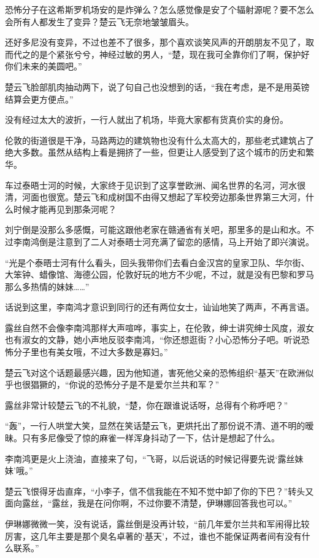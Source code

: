 恐怖分子在这希斯罗机场安的是炸弹么？怎么感觉像是安了个辐射源呢？要不怎么会所有人都发生了变异？楚云飞无奈地皱皱眉头。

还好多尼没有变异，不过也差不了很多，那个喜欢谈笑风声的开朗朋友不见了，取而代之的是个紧张兮兮，神经过敏的男人，“楚，现在我可全靠你们了啊，保护好你们未来的美圆吧。”

楚云飞脸部肌肉抽动两下，说了句自己也没想到的话，“我在考虑，是不是用英镑结算会更方便点。”

没有经过太大的波折，一行人就出了机场，毕竟大家都有货真价实的身份。

伦敦的街道很是干净，马路两边的建筑物也没有什么太高大的，那些老式建筑占了绝大多数。虽然从结构上看是拥挤了一些，但更让人感受到了这个城市的历史和繁华。

车过泰晤士河的时候，大家终于见识到了这享誉欧洲、闻名世界的名河，河水很清，河面也很宽。楚云飞和成树国不由得又想起了军校旁边那条世界第三大河，什么时候才能再见到那条河呢？

刘宁倒是没那么多感慨，可能这跟他老家在赣通省有关吧，那里多的是山和水。不过李南鸿倒是注意到了二人对泰晤士河充满了留恋的感情，马上开始了即兴演说。

“光是个泰晤士河有什么看头，回头我带你们去看白金汉宫的皇家卫队、华尔街、大笨钟、蜡像馆、海德公园，伦敦好玩的地方不少呢，不过，就是没有巴黎和罗马那么多热情的妹妹……”

话说到这里，李南鸿才意识到同行的还有两位女士，讪讪地笑了两声，不再言语。

露丝自然不会像李南鸿那样大声喧哗，事实上，在伦敦，绅士讲究绅士风度，淑女也有淑女的文静，她小声地反驳李南鸿，“你还想逛街？小心恐怖分子吧。听说恐怖分子里也有美女哦，不过大多数是寡妇。”

楚云飞对这个话题最感兴趣，因为他知道，害死他父亲的恐怖组织“基天”在欧洲似乎也很猖獗的，“你说的恐怖分子是不是爱尔兰共和军？”

露丝非常计较楚云飞的不礼貌，“楚，你在跟谁说话呀，总得有个称呼吧？”

“轰”，一行人哄堂大笑，显然在笑话楚云飞，更烘托出了那份说不清、道不明的暧昧。只有多尼像受了惊的麻雀一样浑身抖动了一下，估计是想起了什么。

李南鸿更是火上浇油，直接来了句，“飞哥，以后说话的时候记得要先说‘露丝妹妹’哦。”

楚云飞恨得牙齿直痒，“小李子，信不信我能在不知不觉中卸了你的下巴？”转头又面向露丝，“露丝，我是在问你啊，不过你要不清楚，伊琳娜回答我也可以。”

伊琳娜微微一笑，没有说话，露丝倒是没再计较，“前几年爱尔兰共和军闹得比较厉害，这几年主要是那个臭名卓著的‘基天’，不过，谁也不能保证两者间有没有什么联系。”

